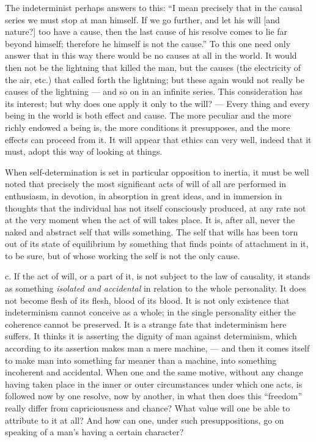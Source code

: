 \documentclass[12pt,a4paper,openany]{book}
\newcommand{\opage}[1]{\marginnote{\footnotesize\textit{[#1]}}}
\begin{document}
The indeterminist perhaps answers to this: ``I mean precisely that in the causal series we must stop at
man himself. If we go further, and let his will [and nature?] too have a cause, then the last cause of his
resolve comes to lie far beyond himself; therefore he himself is not the cause.'' To this one need only
answer that in this way there would be no causes at all in the world. It would then not be the lightning
that
\opage{114}killed the man, but the causes (the electricity of the air, etc.) that called forth the lightning; but
these again would not really be causes of the lightning --- and so on in an infinite series. This
consideration has its interest; but why does one apply it only to the will? --- Every thing and every
being in the world is both effect and cause. The more peculiar and the more richly endowed a being is,
the more conditions it presupposes, and the more effects can proceed from it. It will appear that ethics
can very well, indeed that it must, adopt this way of looking at things.

When self-determination is set in particular opposition to inertia, it must be well noted that precisely
the most significant acts of will of all are performed in enthusiasm, in devotion, in absorption in great
ideas, and in immersion in thoughts that the individual has not itself consciously produced, at any rate
not at the very moment when the act of will takes place. It is, after all, never the naked and abstract
self that wills something. The self that wills has been torn out of its state of equilibrium by something
that finds points of attachment in it, to be sure, but of whose working the self is not the only cause.

c. If the act of will, or a part of it, is not subject to the law of causality, it stands as something
\textit{isolated and accidental} in relation to the whole personality. It does not become flesh of its
flesh, blood of its blood. It is not only existence that indeterminism cannot conceive as a whole; in the
single personality either the coherence cannot be preserved. It is a strange fate that indeterminism here
suffers. It thinks it is asserting the dignity of man against determinism, which according to its
assertion makes man a mere machine, --- and then it comes itself to make man into something far meaner
than a machine, into something incoherent and accidental. When one and the same motive, without any
change having taken place in the inner or outer circumstances under which one acts, is followed now by
one resolve, now by another, in what then does this ``freedom'' really differ from capriciousness and
chance? What value will one be able to attribute to it at all? And how can one, under such
\opage{115}presuppositions, go on speaking of a man's having a certain character?
\end{document}
